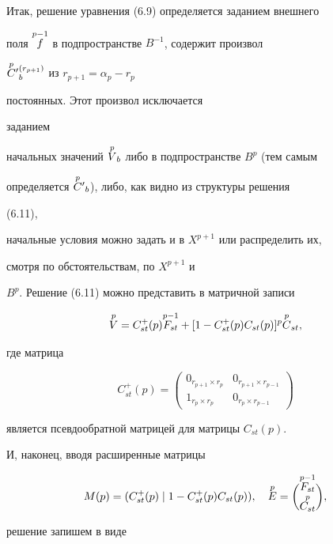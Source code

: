  


Итак, решение уравнения (6.9) определяется заданием внешнего 


поля $\overset{p-1}{f}{}$ в подпространстве $B^{-1}$, содержит произвол 


$\overset{p}{C}{}'{}_b^{(r_{p+1})}$ из $r_{p+1}=\alpha_p-r_p$ 


постоянных. Этот произвол исключается 


заданием 


начальных значений $\overset{p}{V}{}_b$ либо в подпространстве $B^p$ (тем самым 


определяется $\overset{p}{C}{}'{}_b$), либо, как видно из структуры решения 


(6.11), 


начальные условия можно задать и в $X^{p+1}$ или распределить их, 


смотря по обстоятельствам, по $X^{p+1}$ и 


$B^p$. Решение (6.11) можно представить в матричной записи


\begin{equation} 


\up{p}{V}=C^+_{st}(p)\up{p-1}{F_{st}}+ 


[1-C^+_{st}(p)C_{st}(p)]^p\up{p}{C}_{st}, 


\end{equation} 


где матрица 


$$ 


C^+_{st}(p)= 


\begin{pmatrix} 


0_{r_{p+1}\times r_p}& 0_{r_{p+1}\times r_{p-1}}\\ 


1_{r_p\times r_p}& 0_{r_p\times r_{p-1}} 


\end{pmatrix} 


$$ 


является псевдообратной матрицей для матрицы $C_{st}(p)$. 


 


И, наконец, вводя расширенные матрицы 


$$ 


M(p)=(C^+_{st}(p)\mid1-C^+_{st}(p)C_{st}(p)),\quad 


\up{p}{E}=\binom{\up{p-1}{F_{st}}}{\up{p}{C_{st}}},


$$ 


решение запишем в виде 


